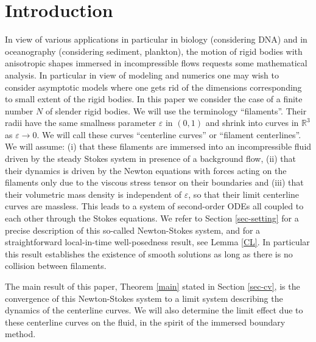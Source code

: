 \documentclass[11pt]{article}
\newcommand{\R}{\mathbb{R}}
\let\eps\varepsilon
\theoremstyle{definition}
\theoremstyle{remark}
\begin{document}
\section{Introduction}
\label{sec-intro}

In view of various applications in particular in biology (considering DNA) and in oceanography (considering sediment, plankton), the motion of rigid bodies with aniso\-tropic shapes immersed in incompressible flows requests some mathematical analysis.
In particular in view of modeling and numerics one may wish to consider asymptotic models where one gets rid of the dimensions corresponding to small extent of the rigid bodies. In this paper we consider the case of a finite number $N$ of slender rigid bodies. We will use the terminology ``filaments''. Their radii have the same smallness parameter $\eps$ in $(0,1)$ and shrink into curves in $\R^3$ as $\eps \to 0$. We will call these curves ``centerline curves'' or ``filament centerlines''. We will assume: (i) that these filaments are immersed into an incompressible fluid driven by the steady Stokes system in presence of a background flow, (ii) that their dynamics is driven by the Newton equations with forces acting on the filaments only due to the viscous stress tensor on their boundaries and (iii) that their volumetric mass density is independent of $\eps$, so that their limit centerline curves are massless.
This leads to a system of second-order ODEs all coupled to each other through the Stokes equations. We refer to Section \ref{sec-setting} for a precise description of this so-called Newton-Stokes system,
and for a straightforward local-in-time well-posedness result, see Lemma \ref{CL}. In particular this result establishes the existence of smooth solutions as long as there is no collision between filaments.

The main result of this paper, Theorem \ref{main} stated in Section \ref{sec-cv}, is the convergence of this Newton-Stokes system to a limit system describing the dynamics of the centerline curves. We will also determine the limit effect due to these centerline curves on the fluid, in the spirit of the immersed boundary method.
\end{document}
